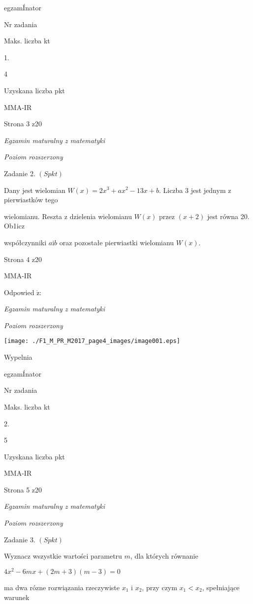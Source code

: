 \documentclass[a4paper,12pt]{article}
\begin{document}
egzamÍnator

Nr zadania

Maks. liczba kt

1.

4

Uzyskana liczba pkt

MMA-IR

Strona 3 z20





{\it Egzamin maturalny z matematyki}

{\it Poziom rozszerzony}

Zadanie 2. $(Spkt)$

Dany jest wielomian $W(x)=2x^{3}+ax^{2}-13x+b$. Liczba 3 jest jednym z pierwiastków tego

wielomianu. Reszta z dzielenia wielomianu $W(x)$ przez $(x+2)$ jest równa 20. Ob1icz

współczynniki $a\mathrm{i}b$ oraz pozostałe pierwiastki wielomianu $W(x).$

Strona 4 z20

MMA-IR





Odpowied $\acute{\mathrm{z}}$:

{\it Egzamin maturalny z matematyki}

{\it Poziom rozszerzony}
\begin{center}
\texttt{[image: ./F1\_M\_PR\_M2017\_page4\_images/image001.eps]}
\end{center}
Wypelnia

egzamÍnator

Nr zadania

Maks. liczba kt

2.

5

Uzyskana liczba pkt

MMA-IR

Strona 5 z20





{\it Egzamin maturalny z matematyki}

{\it Poziom rozszerzony}

Zadanie 3. $(Spkt)$

Wyznacz wszystkie wartości parametru $m$, dla których równanie

$4x^{2}-6mx+(2m+3)(m-3)=0$

ma dwa rózne rozwiązania rzeczywiste $x_{1}$ i $x_{2}$, przy czym $x_{1}<x_{2}$, spełniające warunek
\end{document}
